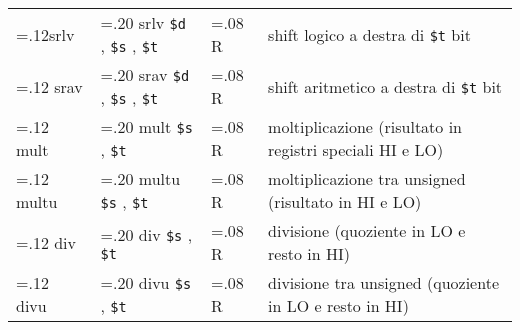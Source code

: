 \documentclass{standalone}
\providecommand\lightrule{%
	\arrayrulecolor{black!30}%
	\midrule[\lightrulewidth]%
	\arrayrulecolor{black}}
\providecommand\register[1]{%
	\texttt{#1}%
}
\begin{document}
\begin{tabularx}{\textwidth}{ >{\hsize=.12\textwidth}X >{\hsize=.20\textwidth}X >{\hsize=.08\textwidth}X X }
		srlv & srlv \register{\$d}, \register{\$s}, \register{\$t} & R & shift logico a destra di \register{\$t} bit \\\lightrule
		srav & srav \register{\$d}, \register{\$s}, \register{\$t} & R & shift aritmetico a destra di \register{\$t} bit \\\lightrule
		mult & mult \register{\$s}, \register{\$t} & R & moltiplicazione (risultato in registri speciali HI e LO) \\\lightrule
		multu & multu \register{\$s}, \register{\$t} & R & moltiplicazione tra unsigned (risultato in HI e LO) \\\lightrule
		div & div \register{\$s}, \register{\$t} & R & divisione (quoziente in LO e resto in HI) \\\lightrule
		divu & divu \register{\$s}, \register{\$t} & R & divisione tra unsigned (quoziente in LO e resto in HI) \\
	\bottomrule
\end{tabularx}
\end{document}
